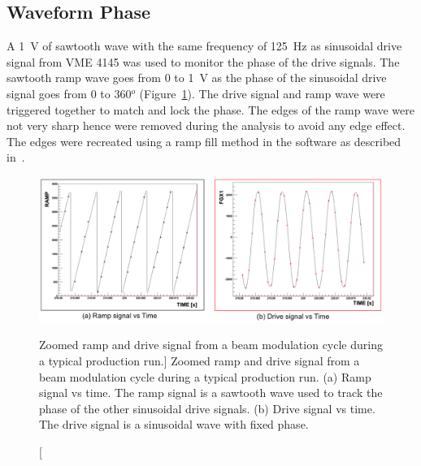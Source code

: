 \subsection{Waveform Phase}
\label{Waveform Phase}
A 1~V of sawtooth wave with the same frequency of 125~Hz as sinusoidal drive signal from VME 4145 was used to monitor the phase of the drive signals. The sawtooth ramp wave goes from 0 to 1~V as the phase of the sinusoidal drive signal goes from 0 to 360$^{o}$ (Figure~\ref{fig:BModSignalZoomed}). The drive signal and ramp wave were triggered together to match and lock the phase. The edges of the ramp wave were not very sharp hence were removed during the analysis to avoid any edge effect. The edges were recreated using a ramp fill method in the software as described in~\cite{elog:don_analysis948}. 

\begin{singlespace}
\begin{figure}[!h]
	\begin{center}
	\includegraphics[width=15.0cm]{figures/BModSignalZoomed}
	\end{center}
	\caption
	[Zoomed ramp and drive signal from a beam modulation cycle during a typical production run.]
	{Zoomed ramp and drive signal from a beam modulation cycle during a typical production run. (a) Ramp signal vs time. The ramp signal is a sawtooth wave used to track the phase of the other sinusoidal drive signals. (b) Drive signal vs time. The drive signal is a sinusoidal wave with fixed phase. }
	\label{fig:BModSignalZoomed}
\end{figure}
\end{singlespace}


